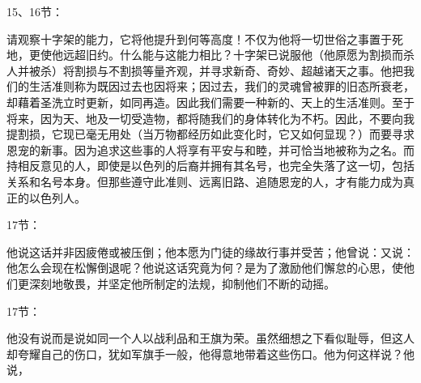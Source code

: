 15、16节：\par

请观察十字架的能力，它将他提升到何等高度！不仅为他将一切世俗之事置于死地，更使他远超旧约。什么能与这能力相比？十字架已说服他（他原愿为割损而杀人并被杀）将割损与不割损等量齐观，并寻求新奇、奇妙、超越诸天之事。他把我们的生活准则称为既因过去也因将来；因过去，我们的灵魂曾被罪的旧态所衰老，却藉着圣洗立时更新，如同再造。因此我们需要一种新的、天上的生活准则。至于将来，因为天、地及一切受造物，都将随我们的身体转化为不朽。因此，不要向我提割损，它现已毫无用处（当万物都经历如此变化时，它又如何显现？）而要寻求恩宠的新事。因为追求这些事的人将享有平安与和睦，并可恰当地被称为之名。而持相反意见的人，即使是以色列的后裔并拥有其名号，也完全失落了这一切，包括关系和名号本身。但那些遵守此准则、远离旧路、追随恩宠的人，才有能力成为真正的以色列人。\par

17节：\par

他说这话并非因疲倦或被压倒；他本愿为门徒的缘故行事并受苦；他曾说：又说：他怎么会现在松懈倒退呢？他说这话究竟为何？是为了激励他们懈怠的心思，使他们更深刻地敬畏，并坚定他所制定的法规，抑制他们不断的动摇。\par

17节：\par

他没有说而是说如同一个人以战利品和王旗为荣。虽然细想之下看似耻辱，但这人却夸耀自己的伤口，犹如军旗手一般，他得意地带着这些伤口。他为何这样说？他说，\par

